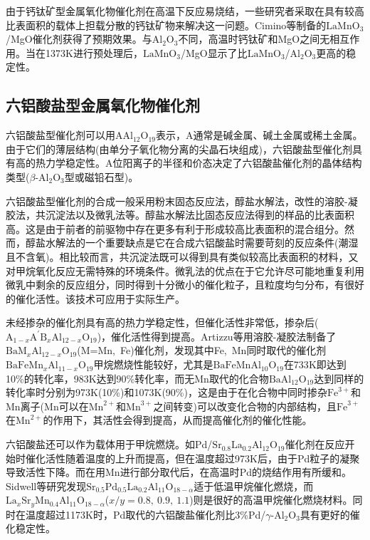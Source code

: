 由于钙钛矿型金属氧化物催化剂在高温下反应易烧结，一些研究者采取在具有较高比表面积的载体上担载分散的钙钛矿物来解决这一问题。\textrm{Cimino}等\cite{CataD59-19_2000}制备的$\mathrm{LaMnO}_3$/\textrm{MgO}催化剂获得了预期效果。与$\mathrm{Al}_2\mathrm{O}_3$不同，高温时钙钛矿和\textrm{MgO}之间无相互作用。当在1373\textrm{K}进行预处理后，$\mathrm{LaMnO}_3$/\textrm{MgO}显示了比$\mathrm{LaMnO}_3$/$\mathrm{Al}_2\mathrm{O}_3$更高的稳定性。

\subsection{六铝酸盐型金属氧化物催化剂}
六铝酸盐型催化剂可以用$\mathrm{AAl}_{12}\mathrm{O}_{19}$表示，\textrm{A}通常是碱金属、碱土金属或稀土金属。由于它们的薄层结构(由单分子氧化物分离的尖晶石块组成)，六铝酸盐型催化剂具有高的热力学稳定性。\textrm{A}位阳离子的半径和价态决定了六铝酸盐催化剂的晶体结构类型($\beta$-$\mathrm{Al}_2\mathrm{O}_3$型或磁铅石型)。

六铝酸盐型催化剂的合成一般采用粉末固态反应法，醇盐水解法，改性的溶胶-凝胶法，共沉淀法以及微乳法\cite{ACA265-207_2004}等。醇盐水解法比固态反应法得到的样品的比表面积高。这是由于前者的前驱物中存在更多有利于形成较高比表面积的混合组分。然而，醇盐水解法的一个重要缺点是它在合成六铝酸盐时需要苛刻的反应条件(潮湿且不含氧)。相比较而言，共沉淀法既可以得到具有类似较高比表面积的材料，又对甲烷氧化反应无需特殊的环境条件。微乳法的优点在于它允许尽可能地重复利用微乳中剩余的反应组分，同时得到十分微小的催化粒子，且粒度均匀分布，有很好的催化活性。该技术可应用于实际生产。

未经掺杂的催化剂具有高的热力学稳定性，但催化活性非常低，掺杂后($\mathrm{A}_{1-x}\mathrm{A}^{\prime}\mathrm{B}_x\mathrm{Al}_{12-x}\mathrm{O}_{19}$)，催化活性得到提高\cite{CataD59-163_2000,MSEA384-324_2004}。Artizzu等\cite{CataD59-163_2000}用溶胶-凝胶法制备了$\mathrm{BaM}_x\mathrm{Al}_{12-x}\mathrm{O}_{19}$(\textrm{M=Mn,~Fe})催化剂，发现其中\textrm{Fe,~Mn}同时取代的催化剂$\mathrm{BaFeMn}_x\mathrm{Al}_{11-x}\mathrm{O}_{19}$甲烷燃烧性能较好，尤其是$\mathrm{BaFeMnAl}_{10}\mathrm{O}_{19}$在733\textrm{K}即达到10\%的转化率，983\textrm{K}达到90\%转化率，而无\textrm{Mn}取代的化合物$\mathrm{BaAl}_{12}\mathrm{O}_{19}$达到同样的转化率时分别为973\textrm{K}(10\%)和1073\textrm{K}(90\%)，这是由于在化合物中同时掺杂$\textrm{Fe}^{3+}$和\textrm{Mn}离子(\textrm{Mn}可以在$\mathrm{Mn}^{2+}$和$\mathrm{Mn}^{3+}$之间转变)可以改变化合物的内部结构，且$\mathrm{Fe}^{3+}$在$\mathrm{Mn}^{2+}$的作用下，其活性会得到提高，从而提高催化剂的催化性能。

六铝酸盐还可以作为载体用于甲烷燃烧。如\textrm{Pd}/$\mathrm{Sr}_{0.8}\mathrm{La}_{0.2}\mathrm{Al}_{12}\mathrm{O}_{19}$催化剂\cite{JMCA186-135_2002}在反应开始时催化活性随着温度的上升而提高，但在温度超过973\textrm{K}后，由于\textrm{Pd}粒子的凝聚导致活性下降。而在用\textrm{Mn}进行部分取代后，在高温时\textrm{Pd}的烧结作用有所缓和。\textrm{Sidwell}\cite{ACA255-279_2003}等研究发现$\mathrm{Sr}_{0.5}\mathrm{Pd}_{0.5}\mathrm{La}_{0.2}\mathrm{Al}_{11}\mathrm{O}_{18-\alpha}$适于低温甲烷催化燃烧，而$\mathrm{La}_x\mathrm{Sr}_y\mathrm{Mn}_{0.4}\mathrm{Al}_{11}\mathrm{O}_{18-\alpha}$($x/y=0.8,~0.9,~1.1$)则是很好的高温甲烷催化燃烧材料。同时在温度超过1173\textrm{K}时，\textrm{Pd}取代的六铝酸盐催化剂比3\%\textrm{Pd}/$\gamma$-$\mathrm{Al}_2\mathrm{O}_3$具有更好的催化稳定性。

